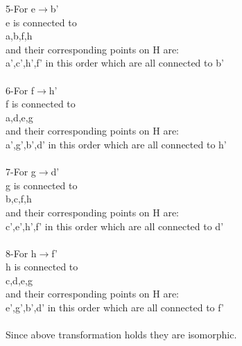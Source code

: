 \documentclass[12pt]{article}
\begin{document}
5-For e$\rightarrow$b’\\
e is connected to\\
a,b,f,h\\
and their corresponding points on H are:\\
a’,c’,h’,f’ in this order which are all connected to b’\\
\\
6-For f$\rightarrow$h’\\
f is connected to\\
a,d,e,g\\
and their corresponding points on H are:\\
a’,g’,b’,d’ in this order which are all connected to h’\\
\\
7-For g$\rightarrow$d’\\
g is connected to\\
b,c,f,h\\
and their corresponding points on H are:\\
c’,e’,h’,f’ in this order which are all connected to d’\\
\\
8-For h$\rightarrow$f’\\
h is connected to\\
c,d,e,g\\
and their corresponding points on H are:\\
e’,g’,b’,d’ in this order which are all connected to f’\\
\\
Since above transformation holds they are isomorphic.
\end{document}
